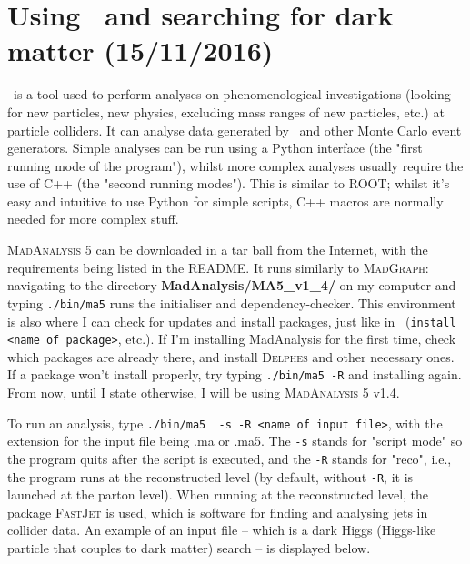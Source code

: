\newpage
\section{Using \madanalysis\ and searching for dark matter (15/11/2016)}

\madanalysis\ is a tool used to perform analyses on phenomenological investigations (looking for new particles, new physics, excluding mass ranges of new particles, etc.) at particle colliders. It can analyse data generated by \madgraph\ and other Monte Carlo event generators. Simple analyses can be run using a Python interface (the "first running mode of the program"), whilst more complex analyses usually require the use of C++ (the "second running modes"). This is similar to ROOT; whilst it's easy and intuitive to use Python for simple scripts, C++ macros are normally needed for more complex stuff.

\textsc{MadAnalysis 5} \cite{Conte:2012madanalysis} can be downloaded in a tar ball from the Internet, with the requirements being listed in the README. It runs similarly to \textsc{MadGraph}: navigating to the directory \textbf{MadAnalysis/MA5\_v1\_4/} on my computer and typing \verb!./bin/ma5! runs the initialiser and dependency-checker. This environment is also where I can check for updates and install packages, just like in \madgraph\ (\verb!install <name of package>!, etc.). If I'm installing MadAnalysis for the first time, check which packages are already there, and install \textsc{Delphes} and other necessary ones. If a package won't install properly, try typing \verb!./bin/ma5 -R! and installing again. From now, until I state otherwise, I will be using \textsc{MadAnalysis 5} v1.4.

To run an analysis, type \verb!./bin/ma5  -s -R <name of input file>!, with the extension for the input file being .ma or .ma5. The \verb!-s! stands for "script mode" so the program quits after the script is executed, and the \verb!-R! stands for "reco", i.e., the program runs at the reconstructed level (by default, without \verb!-R!, it is launched at the parton level). When running at the reconstructed level, the package \textsc{FastJet} \cite{Cacciari:2011fastjet} is used, which is software for finding and analysing jets in collider data. An example of an input file -- which is a dark Higgs (Higgs-like particle that couples to dark matter) search -- is displayed below.



